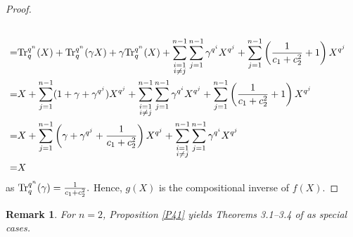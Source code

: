 \documentclass[11pt]{amsart}
\theoremstyle{plain}
\newtheorem{rmk}[thm]{Remark}
\numberwithin{equation}{section}
\theoremstyle{definition}
\def\Tr{{\rm Tr}}
\begin{document}
\begin{proof}
\begin{equation*}
\begin{split}
          \\=&\Tr_{q}^{q^n}(X)+\Tr_{q}^{q^n}(\gamma X)+\gamma \Tr_{q}^{q^n}(X)+\displaystyle\sum_{\substack{i=1\\ i\neq j}}^{n-1}\sum_{j=1}^{n-1}\gamma^{q^i}X^{q^j}+\sum_{j=1}^{n-1}\left(\frac{1}{c_1+c_2^2}+1\right)X^{q^j}
          \\=&X+\sum_{j=1}^{n-1}(1+\gamma+\gamma^{q^j})X^{q^j}+\displaystyle\sum_{\substack{i=1\\ i\neq j}}^{n-1}\sum_{j=1}^{n-1}\gamma^{q^i}X^{q^j}+\sum_{j=1}^{n-1}\left(\frac{1}{c_1+c_2^2}+1\right)X^{q^j}
          \\=&X+\sum_{j=1}^{n-1}\left(\gamma+\gamma^{q^j}+\frac{1}{c_1+c_2^2}\right)X^{q^j}+\displaystyle\sum_{\substack{i=1\\ i\neq j}}^{n-1}\sum_{j=1}^{n-1}\gamma^{q^i}X^{q^j}
          \\=&X
      \end{split}
  \end{equation*}
  as $\Tr_{q}^{q^n}(\gamma)=\frac{1}{c_1+c_2^2}.$ Hence, $g(X)$ is the compositional inverse of $f(X).$
  \end{proof}
  \begin{rmk}
      For $n=2$, Proposition \ref{P41} yields Theorems 3.1--3.4 of \cite{SKP} as special cases.
  \end{rmk}
\end{document}
